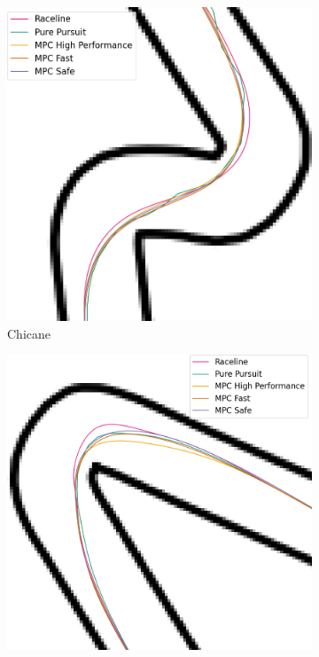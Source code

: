 \begin{figure}[H]
    \centering
    \begin{subfigure}[b]{0.49\textwidth}
        \centering
        \includegraphics[width=\textwidth]{images/spa_traj_comparison_chicane.png} 
        \caption{Chicane}
        \label{fig:chic_spa}
    \end{subfigure}
    \hfill
    \begin{subfigure}{0.49\textwidth}
        \centering
        \includegraphics[width=\textwidth]{images/spa_traj_comparison_curva.png}

\end{subfigure}
\end{figure}
